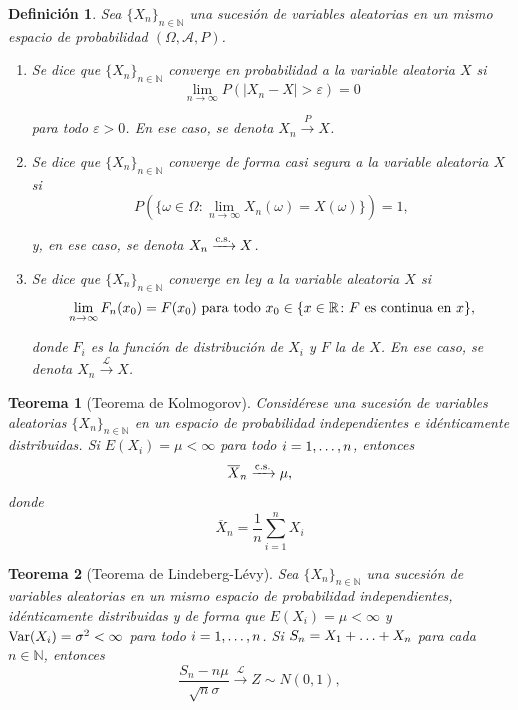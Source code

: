 \documentclass[11pt]{report}
\newtheorem{theorem}{Teorema}
\newtheorem{definition}{Definición}
\theoremstyle{definition}
\newcommand{\R}{\mathbb R}
\newcommand{\N}{\mathbb N}
\begin{document}
\begin{definition}
    Sea $\{X_n\}_{n \in \N}$ una sucesión de variables aleatorias en un mismo espacio de probabilidad $(\Omega, \mathcal{A},P)$. 
    \begin{enumerate}
        \item Se dice que \emph{$\{X_n\}_{n \in \N}$ converge en probabilidad a la variable aleatoria $X$} si
    \[\lim_{n \to \infty} P(|X_n-X|>\varepsilon) =0\]

    \vspace{-4mm}
    
    para todo $\varepsilon >0$. En ese caso, se denota $X_n \xrightarrow{P} X$.
    \item Se dice que \emph{$\{X_n\}_{n \in \N}$ converge de forma casi segura a la variable aleatoria $X$} si
\[P(\{\omega \in \Omega \colon \lim_{n\to \infty}X_n(\omega)=X(\omega)\})=1,\]

\vspace{-4mm}

y, en ese caso, se denota $X_n \xrightarrow{\textup{c.s.}} X$.
\item Se dice que \emph{$\{X_n\}_{n \in \N}$ converge en ley a la variable aleatoria $X$} si
\[\lim_{n \to \infty}F_n(x_0) = F(x_0) \textup{ para todo } x_0 \in \{x \in \R \colon F \textup{ es continua en } x\},\]

\vspace{-4mm}

donde $F_i$ es la función de distribución de $X_i$ y $F$ la de $X$. En ese caso, se denota $X_n \xrightarrow{\mathcal{L}} X$.
    \end{enumerate}
    
\end{definition}

\begin{theorem}[Teorema de Kolmogorov]
Considérese una sucesión de variables aleatorias $\{X_n\}_{n \in \N}$ en un espacio de probabilidad independientes e idénticamente distribuidas. Si $E(X_i) = \mu < \infty$ para todo $i =1,\mathellipsis,n$, entonces
    \[\overline{X}_n \xrightarrow{\textup{c.s.}} \mu,\]
    donde
    \[\overline{X}_n = \frac{1}{n}\sum_{i=1}^n X_i\]
\end{theorem}

\begin{theorem}[Teorema de Lindeberg-Lévy]
Sea $\{X_n\}_{n \in \N}$ una sucesión de variables aleatorias en un mismo espacio de probabilidad independientes, idénticamente distribuidas y de forma que $E(X_i) = \mu < \infty$ y $\textup{Var}(X_i) =\sigma^2 < \infty$ para todo $i =1,\mathellipsis,n$. Si $S_n=X_1+\mathellipsis+X_n$ para cada $n \in \N$, entonces
\[\frac{S_n-n\mu}{\sqrt{n}\sigma} \xrightarrow{\mathcal{L}}Z \sim N(0,1),\]
\end{theorem}
\end{document}

